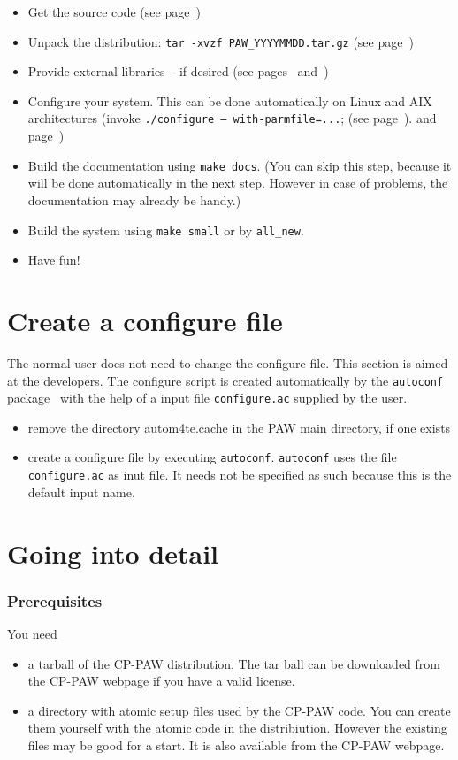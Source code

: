 \documentclass[a4paper,10pt]{article}
\begin{document}
\begin{itemize}
\item Get the source code (see page~\pageref{sub:pre})
\item Unpack the distribution: \texttt{tar -xvzf PAW\_YYYYMMDD.tar.gz} (see
page~\pageref{sub:unpack})
\item Provide external libraries -- if desired (see pages~\pageref{sub:libs}
and~\pageref{sec:libs})
\item Configure your system. This can be done automatically on Linux
  and AIX architectures (invoke \texttt{./configure --
    with-parmfile=...}; (see page~\pageref{sub:auto}).  and
  page~\pageref{sub:parms})
\item Build the documentation using \texttt{make docs}. (You can skip
  this step, because it will be done automatically in the next step.
  However in case of problems, the documentation may already be handy.)
\item Build the system using \texttt{make small} or by \texttt{all\_new}.
\item Have fun!
\end{itemize}

\section{Create a configure file}

The normal user does not need to change the configure file. This
section is aimed at the developers. The configure script is created
automatically by the \texttt{autoconf}
package~\cite{autoconf,autoconf2} with the help of a input file
\texttt{configure.ac} supplied by the user.
\begin{itemize}
\item remove the directory autom4te.cache in the PAW main directory, if one exists
\item create a configure file by executing \texttt{autoconf}.
  \texttt{autoconf} uses the file \texttt{configure.ac} as inut file.
  It needs not be specified as such because this is the default input
  name. 
\end{itemize}

\section{Going into detail}

\subsubsection*{Prerequisites}
\label{sub:pre}
You need 
\begin{itemize}
\item a tarball of the CP-PAW distribution. The tar ball can be
  downloaded from the CP-PAW webpage if you have a valid license. 
\item a directory with atomic setup files used by the CP-PAW code. You
  can create them yourself with the atomic code in the distribiution.
  However the existing files may be good for a start. It is also
  available from the CP-PAW webpage.
\end{itemize}
\end{document}
